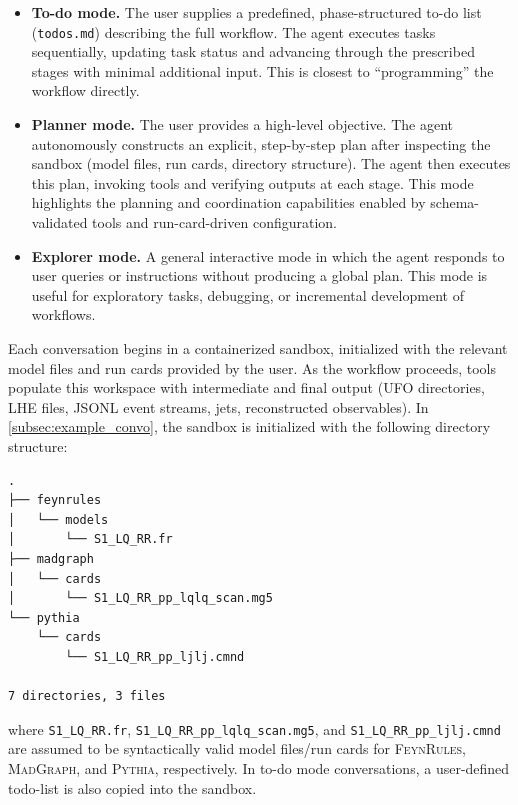 \documentclass[11pt,oneside]{article}
\numberwithin{equation}{section}
\begin{document}
\begin{itemize}
  \item \textbf{To-do mode.}
  The user supplies a predefined, phase-structured to-do list (\texttt{todos.md}) describing the full workflow. 
  The agent executes tasks sequentially, updating task status and advancing through the prescribed stages with minimal additional input. This is closest to “programming” the workflow directly.

  \item \textbf{Planner mode.}
  The user provides a high-level objective. The agent autonomously constructs an explicit, step-by-step plan after inspecting the sandbox (model files, run cards, directory structure).
  The agent then executes this plan, invoking tools and verifying outputs at each stage. 
  This mode highlights the planning and coordination capabilities enabled by schema-validated tools and run-card-driven configuration.

  \item \textbf{Explorer mode.}
  A general interactive mode in which the agent responds to user queries or instructions without producing a global plan. 
  This mode is useful for exploratory tasks, debugging, or incremental development of workflows.
\end{itemize}


Each conversation begins in a containerized sandbox, initialized with the relevant model files and run cards provided by the user. 
As the workflow proceeds, tools populate this workspace with intermediate and final output (UFO directories, LHE files, JSONL event streams, jets, reconstructed observables).
In \cref{subsec:example_convo}, the sandbox is initialized with the following directory structure:
\begin{orchestralsystemmessage}

\begin{verbatim}
.
├── feynrules
│   └── models
│       └── S1_LQ_RR.fr
├── madgraph
│   └── cards
│       └── S1_LQ_RR_pp_lqlq_scan.mg5
└── pythia
    └── cards
        └── S1_LQ_RR_pp_ljlj.cmnd

7 directories, 3 files
\end{verbatim}
    \end{orchestralsystemmessage}
where \texttt{S1\_LQ\_RR.fr}, \texttt{S1\_LQ\_RR\_pp\_lqlq\_scan.mg5}, and \texttt{S1\_LQ\_RR\_pp\_ljlj.cmnd} are assumed to be syntactically valid model files/run cards for \textsc{FeynRules}, \textsc{MadGraph}, and \textsc{Pythia}, respectively.
In to-do mode conversations, a user-defined todo-list is also copied into the sandbox.
\end{document}
